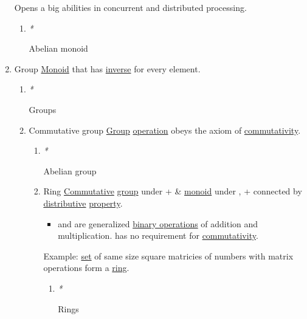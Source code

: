 \documentclass[11pt]{article}
\begin{document}
\begin{enumerate}
Opens a big abilities in concurrent and distributed processing.\\

\begin{enumerate}
\item \emph{*}
\label{sec:org2afc75d}

\label{org1cad511}Abelian monoid\\
\end{enumerate}

\item \label{orgc937439}Group
\label{sec:org316d8b2}
\hyperref[org37d140b]{Monoid} that has \hyperref[org0da4e7e]{inverse} for every element.\\

\begin{enumerate}
\item \emph{*}
\label{sec:orgb7b6c4d}

\label{org734e757}Groups\\

\item \label{orgffdb566}Commutative group
\label{sec:org0ab92e1}
\hyperref[orgc937439]{Group} \hyperref[org1173fe8]{operation} obeys the axiom of \hyperref[org78de62b]{commutativity}.\\

\begin{enumerate}
\item \emph{*}
\label{sec:org01308a7}

\label{org1992f6e}Abelian group\\

\item \label{orgce31c9f}Ring
\label{sec:org29f2f80}
\hyperref[orgb53f83d]{Commutative} \hyperref[orgc937439]{group} under + \& \hyperref[org37d140b]{monoid} under \texttimes{}, + \texttimes{} connected by \hyperref[org755ce9a]{distributive} \hyperref[orgf8c3cc7]{property}.\\

\begin{itemize}
\item and \texttimes{} are generalized \hyperref[org1f69dbb]{binary operations} of addition and multiplication. \texttimes{} has no requirement for \hyperref[org78de62b]{commutativity}.\\
\end{itemize}

Example: \hyperref[org1faf06d]{set} of same size square matricies of numbers with matrix operations form a \hyperref[orgce31c9f]{ring}.\\

\begin{enumerate}
\item \emph{*}
\label{sec:orgfe68602}

\label{org5c1a89f}Rings\\
\end{enumerate}
\end{enumerate}
\end{enumerate}
\end{enumerate}
\end{document}
